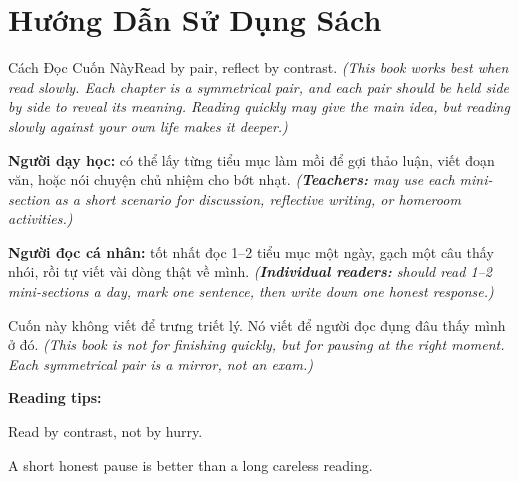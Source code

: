 \chapter*{Hướng Dẫn Sử Dụng Sách}

\begin{truyen}{Cách Đọc Cuốn Này}{Read by pair, reflect by contrast.}
\textit{(This book works best when read slowly. Each chapter is a symmetrical pair, and each pair should be held side by side to reveal its meaning. Reading quickly may give the main idea, but reading slowly against your own life makes it deeper.)}

\textbf{Người dạy học:} có thể lấy từng tiểu mục làm mồi để gợi thảo luận, viết đoạn văn, hoặc nói chuyện chủ nhiệm cho bớt nhạt.
\textit{(\textbf{Teachers:} may use each mini-section as a short scenario for discussion, reflective writing, or homeroom activities.)}

\textbf{Người đọc cá nhân:} tốt nhất đọc 1--2 tiểu mục một ngày, gạch một câu thấy nhói, rồi tự viết vài dòng thật về mình.
\textit{(\textbf{Individual readers:} should read 1--2 mini-sections a day, mark one sentence, then write down one honest response.)}
\end{truyen}

\begin{baihoc}
Cuốn này không viết để trưng triết lý. Nó viết để người đọc đụng đâu thấy mình ở đó.
\textit{(This book is not for finishing quickly, but for pausing at the right moment. Each symmetrical pair is a mirror, not an exam.)}
\end{baihoc}

\begin{ghinhoanh}
\textbf{Reading tips:}

Read by contrast, not by hurry.

A short honest pause is better than a long careless reading.
\end{ghinhoanh}

\ngancach
